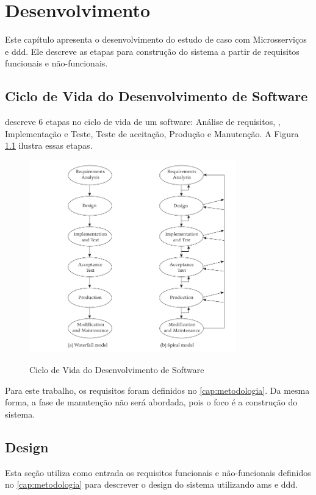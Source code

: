 \chapter{Desenvolvimento}
\label{cap:desenvolvimento}

Este capítulo apresenta o desenvolvimento do estudo de caso com Microsserviços e \acrshort{ddd}. Ele descreve as etapas para construção do sistema a partir de requisitos funcionais e não-funcionais.

\section{Ciclo de Vida do Desenvolvimento de Software}
 descreve 6 etapas no ciclo de vida de um software: Análise de requisitos, , Implementação e Teste, Teste de aceitação, Produção e Manutenção. A Figura \ref{fig:ciclo-vida} ilustra essas etapas. 

\begin{figure}[H]
    \centering
    \caption{Ciclo de Vida do Desenvolvimento de Software}
    \includegraphics[width=0.8\textwidth]{media/software-life-cycle.png}
    \label{fig:ciclo-vida}
\end{figure}

Para este trabalho, os requisitos foram definidos no \autoref{cap:metodologia}. Da mesma forma, a fase de manutenção não será abordada, pois o foco é a construção do sistema.

\section{Design}
Esta seção utiliza como entrada os requisitos funcionais e não-funcionais definidos no \autoref{cap:metodologia} para descrever o design do sistema utilizando \acrfull{ams} e \acrfull{ddd}.

